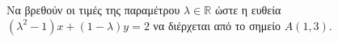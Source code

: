 Να βρεθούν οι τιμές της παραμέτρου $ \lambda\in\mathbb{R} $ ώστε η ευθεία $ (\lambda^2-1)x+(1-\lambda)y=2 $ να διέρχεται από το σημείο $ A(1,3) $.
